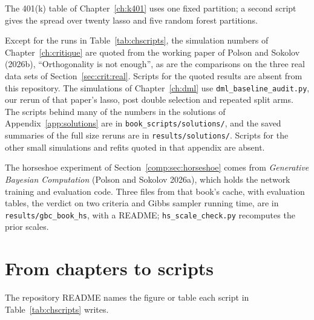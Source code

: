 The 401(k) table of Chapter~\ref{ch:k401} uses one fixed partition; a second script gives the spread over twenty lasso and five random forest partitions.

Except for the runs in Table~\ref{tab:chscripts}, the simulation numbers of Chapter~\ref{ch:critique} are quoted from the working paper of Polson and Sokolov (2026b), ``Orthogonality is not enough'', as are the comparisons on the three real data sets of Section~\ref{sec:crit:real}. Scripts for the quoted results are absent from this repository. The simulations of Chapter~\ref{ch:dml} use \texttt{dml\_baseline\_audit.py}, our rerun of that paper's lasso, post double selection and repeated split arms. The scripts behind many of the numbers in the solutions of Appendix~\ref{app:solutions} are in \texttt{book\_scripts/solutions/}, and the saved summaries of the full size reruns are in \texttt{results/solutions/}. Scripts for the other small simulations and refits quoted in that appendix are absent.

The horseshoe experiment of Section~\ref{comp:sec:horseshoe} comes from \emph{Generative Bayesian Computation} (Polson and Sokolov 2026a), which holds the network training and evaluation code. Three files from that book's cache, with evaluation tables, the verdict on two criteria and Gibbs sampler running time, are in \texttt{results/gbc\_book\_hs}, with a README; \texttt{hs\_scale\_check.py} recomputes the prior scales.

\section{From chapters to scripts}

The repository README names the figure or table each script in Table~\ref{tab:chscripts} writes.

